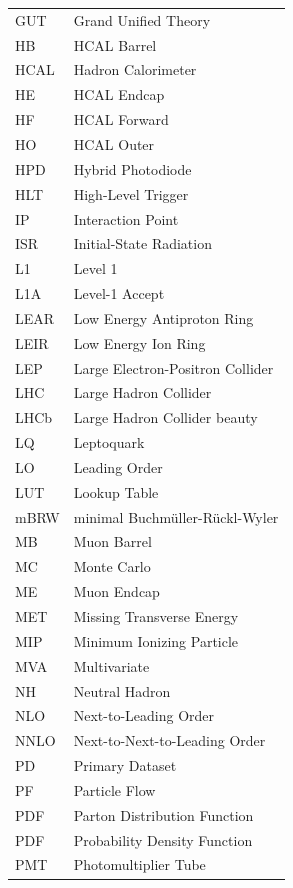 \documentclass[12pt]{thesis}  %
\begin{document}
\begin{longtable}[l]{@{}l@{\ \ \ \ \ \ \ \ \ \ \ \ }l}
GUT        & Grand Unified Theory \\
HB         & HCAL Barrel \\
HCAL       & Hadron Calorimeter \\
HE         & HCAL Endcap \\
HF         & HCAL Forward \\
HO         & HCAL Outer \\
HPD        & Hybrid Photodiode \\
HLT        & High-Level Trigger \\
IP         & Interaction Point \\
ISR        & Initial-State Radiation \\
L1         & Level 1 \\
L1A        & Level-1 Accept \\
LEAR       & Low Energy Antiproton Ring \\
LEIR       & Low Energy Ion Ring \\
LEP        & Large Electron-Positron Collider \\
LHC        & Large Hadron Collider \\
LHCb       & Large Hadron Collider beauty \\
LQ         & Leptoquark \\
LO         & Leading Order \\
LUT        & Lookup Table \\
mBRW       & minimal Buchm\"{u}ller-R\"{u}ckl-Wyler \\
MB         & Muon Barrel \\
MC         & Monte Carlo \\
ME         & Muon Endcap \\
MET        & Missing Transverse Energy \\
MIP        & Minimum Ionizing Particle \\
MVA        & Multivariate \\
NH         & Neutral Hadron \\
NLO        & Next-to-Leading Order \\
NNLO       & Next-to-Next-to-Leading Order \\
PD         & Primary Dataset \\
PF         & Particle Flow \\
PDF        & Parton Distribution Function \\
PDF        & Probability Density Function \\
PMT        & Photomultiplier Tube \\

\end{longtable}
\end{document}

